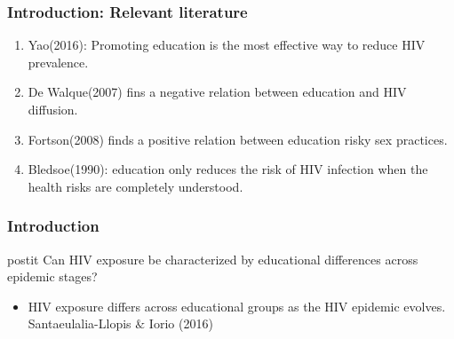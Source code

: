 \documentclass{beamer}
\begin{document}
\begin{frame}
\frametitle{Introduction: Relevant literature}
\begin{enumerate}
\item Yao(2016): Promoting education is the most effective way to reduce HIV prevalence.
\item De Walque(2007) fins a negative relation between education and HIV diffusion.
\item Fortson(2008) finds  a positive relation between education risky sex practices.
\item Bledsoe(1990): education only reduces the risk of HIV infection when the health risks are completely understood.

\end{enumerate}
\end{frame}
\begin{frame}
\frametitle{Introduction}

\begin{beamercolorbox}[wd=\textwidth,rounded=true,shadow=true]{postit}
\centering \large Can HIV exposure be characterized by educational differences across epidemic stages?
\end{beamercolorbox}
\vspace{1cm}
\begin{Large}
\begin{itemize}
\item HIV exposure differs across educational groups as the HIV epidemic evolves. Santaeulalia-Llopis $\&$ Iorio (2016)
       
\end{itemize}
\end{Large}

\end{frame}
\end{document}
